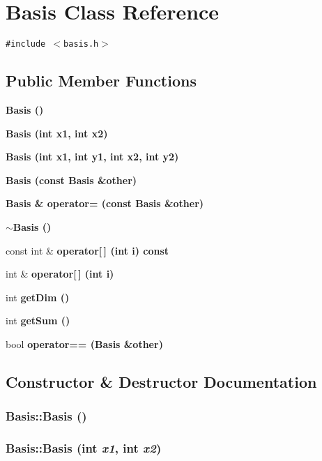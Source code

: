 \section{Basis Class Reference}
\label{classBasis}
{\tt \#include $<$basis.h$>$}

\subsection*{Public Member Functions}
\begin{CompactItemize}
\item 
\bf{Basis} ()
\item 
\bf{Basis} (int x1, int x2)
\item 
\bf{Basis} (int x1, int y1, int x2, int y2)
\item 
\bf{Basis} (const \bf{Basis} \&other)
\item 
\bf{Basis} \& \bf{operator=} (const \bf{Basis} \&other)
\item 
\bf{$\sim$Basis} ()
\item 
const int \& \bf{operator[$\,$]} (int i) const 
\item 
int \& \bf{operator[$\,$]} (int i)
\item 
int \bf{get\-Dim} ()
\item 
int \bf{get\-Sum} ()
\item 
bool \bf{operator==} (\bf{Basis} \&other)
\end{CompactItemize}


\subsection{Constructor \& Destructor Documentation}
\subsubsection{\setlength{\rightskip}{0pt plus 5cm}Basis::Basis ()\hspace{0.3cm}{\tt  [inline]}}\label{classBasis_5310113a68f012f9fea006a34d41fe52}


\subsubsection{\setlength{\rightskip}{0pt plus 5cm}Basis::Basis (int {\em x1}, int {\em x2})\hspace{0.3cm}{\tt  [inline]}}\label{classBasis_9fe107e768f7e351876c120f12f21a8d}


